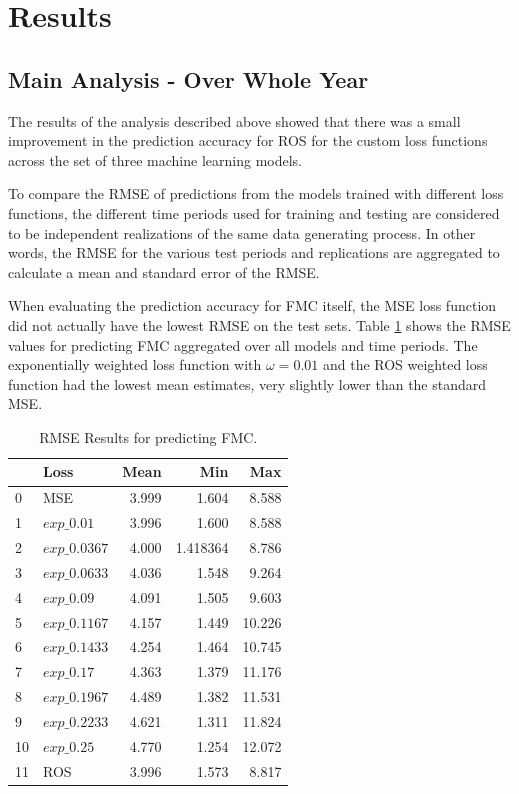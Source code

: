 \documentclass[11pt]{article}%
\begin{document}
\section{Results}

\subsection{Main Analysis - Over Whole Year}

The results of the analysis described above showed that there was a small improvement in the prediction accuracy for ROS for the custom loss functions across the set of three machine learning models.

To compare the RMSE of predictions from the models trained with different loss functions, the different time periods used for training and testing are considered to be independent realizations of the same data generating process. In other words, the RMSE for the various test periods and replications are aggregated to calculate a mean and standard error of the RMSE. 

When evaluating the prediction accuracy for FMC itself, the MSE loss function did not actually have the lowest RMSE on the test sets. Table \ref{tab:fmc_results} shows the RMSE values for predicting FMC aggregated over all models and time periods. The exponentially weighted loss function with $\omega=0.01$ and the ROS weighted loss function had the lowest mean estimates, very slightly lower than the standard MSE. 

\begin{table}[ht]
\centering
\caption{RMSE Results for predicting FMC.}
\label{tab:fmc_results}
\begin{tabular}{llrrr}
\toprule
 & Loss & Mean & Min & Max \\
\midrule
0 & MSE & 3.999 & 1.604 & 8.588 \\
1 & $exp\_0.01$ & 3.996 & 1.600 & 8.588 \\
2 & $exp\_0.0367$ & 4.000 & 1.418364 & 8.786 \\
3 & $exp\_0.0633$ & 4.036 & 1.548 & 9.264 \\
4 & $exp\_0.09$ & 4.091 & 1.505 & 9.603 \\
5 & $exp\_0.1167$ & 4.157 & 1.449 & 10.226 \\
6 & $exp\_0.1433$ & 4.254 & 1.464 & 10.745 \\
7 & $exp\_0.17$ & 4.363 & 1.379 & 11.176 \\
8 & $exp\_0.1967$ & 4.489 & 1.382 & 11.531 \\
9 & $exp\_0.2233$ & 4.621 & 1.311 & 11.824 \\
10 & $exp\_0.25$ & 4.770 & 1.254 & 12.072 \\
11 & ROS & 3.996 & 1.573 & 8.817 \\
\bottomrule
\end{tabular}
\end{table}
\end{document}
